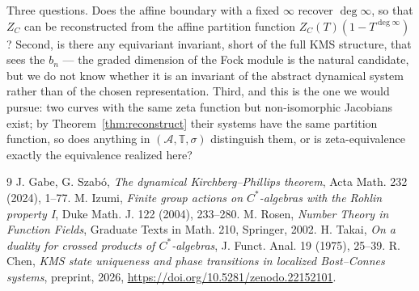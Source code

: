 \documentclass[11pt]{amsart}
\numberwithin{equation}{section}
\theoremstyle{definition}
\theoremstyle{remark}
\newcommand{\T}{\mathbb{T}}
\newcommand{\cA}{\mathcal{A}}
\begin{document}
Three questions. Does the affine boundary with a fixed $\infty$ recover $\deg\infty$, so that
$Z_C$ can be reconstructed from the affine partition function $Z_C(T)(1-T^{\deg\infty})$?
Second, is there any equivariant invariant, short of the full KMS structure, that sees the
$b_n$ --- the graded dimension of the Fock module is the natural candidate, but we do not know
whether it is an invariant of the abstract dynamical system rather than of the chosen
representation. Third, and this is the one we would pursue: two curves with the same zeta
function but non-isomorphic Jacobians exist; by Theorem~\ref{thm:reconstruct} their systems
have the same partition function, so does anything in $(\cA,\T,\sigma)$ distinguish them, or
is zeta-equivalence exactly the equivalence realized here?

\begin{thebibliography}{9}
 J. Gabe, G. Szab\'o, \emph{The dynamical Kirchberg--Phillips theorem}, Acta Math. 232 (2024), 1--77.
 M. Izumi, \emph{Finite group actions on $C^*$-algebras with the Rohlin property I}, Duke Math. J. 122 (2004), 233--280.
 M. Rosen, \emph{Number Theory in Function Fields}, Graduate Texts in Math. 210, Springer, 2002.
 H. Takai, \emph{On a duality for crossed products of $C^*$-algebras}, J. Funct. Anal. 19 (1975), 25--39.
 R. Chen, \emph{KMS state uniqueness and phase transitions in localized Bost--Connes systems}, preprint, 2026, \newline\url{https://doi.org/10.5281/zenodo.22152101}.
\end{thebibliography}
\end{document}
